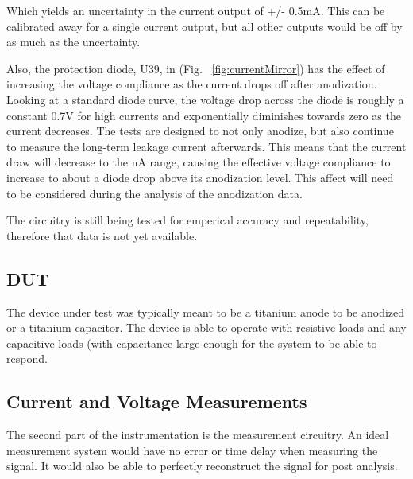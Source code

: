 \documentclass[journal]{IEEEtran}
\begin{document}
    Which yields an uncertainty in the current output of +/- 0.5mA. This can be calibrated away for a single current output, but all other outputs would be off by as much as the uncertainty.

    Also, the protection diode, U39, in (Fig. ~\ref{fig:currentMirror}) has the effect of increasing the voltage compliance as the current drops off after anodization. Looking at a standard diode curve, the voltage drop across the diode is roughly a constant 0.7V for high currents and exponentially diminishes towards zero as the current decreases. The tests are designed to not only anodize, but also continue to measure the long-term leakage current afterwards. This means that the current draw will decrease to the nA range, causing the effective voltage compliance to increase to about a diode drop above its anodization level. This affect will need to be considered during the analysis of the anodization data.

    The circuitry is still being tested for emperical accuracy and repeatability, therefore that data is not yet available.

    \subsection{DUT}

    The device under test was typically meant to be a titanium anode to be anodized or a titanium capacitor. The device is able to operate with resistive loads and any capacitive loads (with capacitance large enough for the system to be able to respond.


            \subsection{Current and Voltage Measurements}

            The second part of the instrumentation is the measurement circuitry. An ideal measurement system would have no error or time delay when measuring the signal. It would also be able to perfectly reconstruct the signal for post analysis. 
\end{document}

